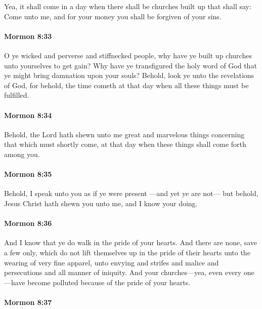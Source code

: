 			Yea, it shall come in a day
			when there shall be churches built up that shall say:
			Come unto me, and for your money you shall be forgiven of your sins.

		\paragraph{Mormon 8:33} %
			\label{MORMON-8-33}

			O ye wicked and perverse and stiffnecked people,
			why have ye built up churches unto yourselves to get gain?
			Why have ye transfigured the holy word of God
			that ye might bring damnation upon your souls?
			Behold, look ye unto the revelations of God,
			for behold, the time cometh at that day
			when all these things must be fulfilled.

		\paragraph{Mormon 8:34} %
			\label{MORMON-8-34}

			Behold, the Lord hath shewn unto me great and marvelous things
			concerning that which must shortly come,
			at that day when these things shall come forth among you.

		\paragraph{Mormon 8:35} %
			\label{MORMON-8-35}

			Behold, I speak unto you as if ye were present
			---and yet ye are not---
			but behold, Jesus Christ hath shewn you unto me,
			and I know your doing.

		\paragraph{Mormon 8:36} %
			\label{MORMON-8-36}

			And I know that ye do walk in the pride of your hearts.
			And there are none, save a few only,
			which do not lift themselves up in the pride of their hearts
			unto the wearing of very fine apparel,
			unto envying and strifes and malice and persecutions
			and all manner of iniquity.
			And your churches---yea, even every one---have become polluted
			because of the pride of your hearts.

		\paragraph{Mormon 8:37} %
			\label{MORMON-8-37}

